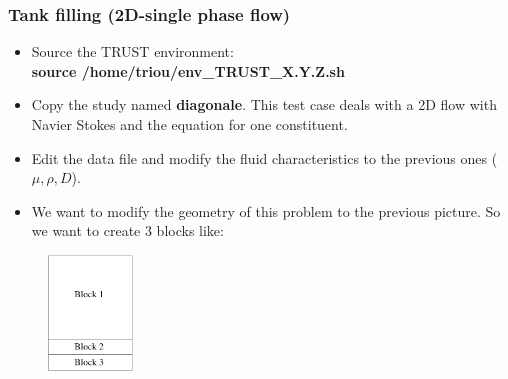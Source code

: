 \documentclass[10pt, hyperref={unicode=true,pdfusetitle, bookmarks=true,bookmarksnumbered=false,bookmarksopen=false, breaklinks=false,pdfborder={0 0 1},backref=true,colorlinks=true,linkcolor=darkblue,pageanchor}]{beamer}
\begin{document}
\begin{frame}
\frametitle{Tank filling (2D-single phase flow)}
\begin{block}{}

\begin{itemize}
\item Source the TRUST environment:\\
\textbf{source /home/triou/env\_TRUST\_X.Y.Z.sh}
\item Copy the study named \textbf{diagonale}. This test case deals with a 2D flow with Navier Stokes and the equation for one constituent.
\item Edit the data file and modify the fluid characteristics to the previous ones ($\mu, \rho, D$).
\item We want to modify the geometry of this problem to the previous picture. So we want to create 3 blocks like:
\end{itemize}

\begin{figure}
\includegraphics[width=0.2\textwidth]{PICTURES/tank2D_2.pdf}
\end{figure}

\end{block}
\end{frame}
\end{document}
